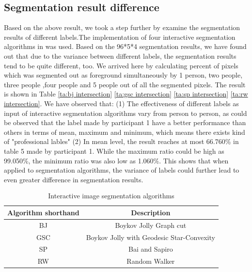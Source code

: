 \documentclass[runningheads,a4paper]{llncs}
\begin{document}
\subsection{Segmentation result difference}
Based on the above result, we took a step further by examine the segmentation results of different labels.The implementation of four interactive segmentation algorithms in \cite{gulshan2010geodesic} was used. Based on the 96*5*4 segmentation results, we have found out that due to the variance between different labels, the segmentation results tend to be quite different, too.  We arrived here by calculating percent of pixels which was segmented out as foreground simultaneously by 1 person, two people, three people ,four people and 5 people out of all the segmented pixels. The result is shown in Table \ref{ta:bj intersection} \ref{ta:gsc intersection} \ref{ta:sp intersection} \ref{ta:rw intersection}. We have observed that: (1) The effectiveness of different labels as input of interactive segmentation algorithms vary from person to person, as could be observed that the label made by participant 1 have a better performance than others in terms of mean, maximum and minimum, which means there exists kind of "professional lables" \cite{fu2008saliency} (2) In mean level, the result reaches at most 66.760\% in table 5 made by participant 1. While the maximum ratio could be high as 99.050\%, the minimum ratio was also low as 1.060\%. This shows that when applied to segmentation algorithms, the variance of labels could further lead to even greater difference in segmentation results.

\begin{table}
\centering
\begin{tabular}{|c|c|}
\hline
Algorithm shorthand & Description\\
\hline
BJ\cite{boykov2001interactive} &  Boykov Jolly Graph cut  \\
\hline
GSC\cite{gulshan2010geodesic}& Boykov Jolly with Geodesic Star-Convexity \\
\hline
SP\cite{bai2007geodesic} & Bai and Sapiro \\
\hline
RW\cite {grady2006random}& Random Walker  \\
\hline
\end{tabular}
\caption{Interactive image segmentation algorithms}
\label{ta:algorithms}
\end{table}
\end{document}
